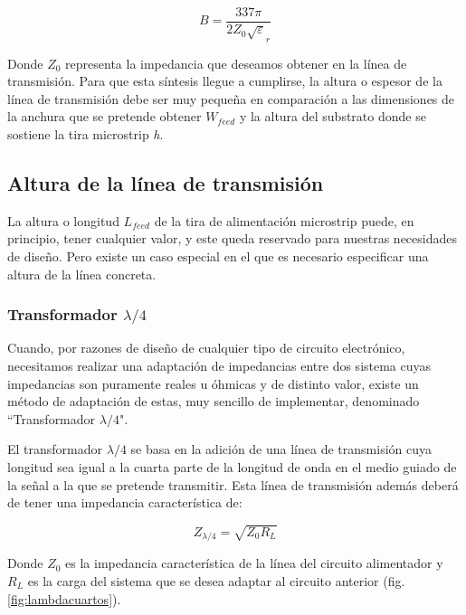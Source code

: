 \begin{equation}
	B=\frac{337\pi}{2Z_{0}\sqrt\varepsilon_{r}} 
	\label{eq:B}
\end{equation}

\par Donde $Z_{0}$ representa la impedancia que deseamos obtener en la línea de transmisión. Para que esta síntesis llegue a cumplirse, la altura o espesor de la línea de transmisión debe ser muy pequeña en comparación a las dimensiones de la anchura que se pretende obtener $W_{feed}$ y la altura del substrato donde se sostiene la tira microstrip \textit{h}.

\subsection{Altura de la línea de transmisión}
\par La altura o longitud $L_{feed}$ de la tira de alimentación microstrip puede, en principio, tener cualquier valor, y este queda reservado para nuestras necesidades de diseño. Pero existe un caso especial en el que es necesario especificar una altura de la línea concreta.

\subsubsection{Transformador $\lambda/4$}
\label{lambdacuartoscap}

\par Cuando, por razones de diseño de cualquier tipo de circuito electrónico, necesitamos realizar una adaptación de impedancias entre dos sistema cuyas impedancias son puramente reales u óhmicas y de distinto valor, existe un método de adaptación de estas, muy sencillo de implementar, denominado ``Transformador $\lambda/4$". 
\\
\par El transformador $\lambda/4$ se basa en la adición de una línea de transmisión cuya longitud sea igual a la cuarta parte de la longitud de onda en el medio guiado de la señal a la que se pretende transmitir. Esta línea de transmisión además deberá de tener una impedancia característica de:

\begin{equation}
	Z_{\lambda /4}=\sqrt{Z_{0}R_{L}}
	\label{eq:lambdacuartos}
\end{equation}

\par Donde $Z_{0}$ es la impedancia característica de la línea del circuito alimentador y $R_{L}$ es la carga del sistema que se desea adaptar al circuito anterior (fig. \ref{fig:lambdacuartos}).

